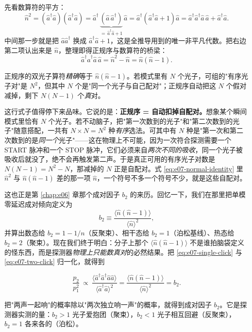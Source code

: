 先看数算符的平方：
\[
  \hat n^2=(\hat a^\dagger\hat a)(\hat a^\dagger\hat a)
  =\hat a^\dagger\,\underbrace{(\hat a\,\hat a^\dagger)}_{=\,\hat a^\dagger\hat a+1}\,\hat a
  =\hat a^\dagger(\hat a^\dagger\hat a+1)\hat a
  =\hat a^\dagger\hat a^\dagger\hat a\,\hat a+\hat a^\dagger\hat a .
\]
中间那一步就是把 \(\hat a\hat a^\dagger\) 换成 \(\hat a^\dagger\hat a+1\)，这是全推导用到的唯一非平凡代数。把右边第二项认出来是 \(\hat n\)，整理即得正规序与数算符的桥梁：
\begin{equation}
  \hat a^\dagger\hat a^\dagger\hat a\,\hat a
  =\hat n^2-\hat n
  =\hat n(\hat n-1).
  \label{eq:e07-normal-identity}
\end{equation}
\begin{formulaexplain}
正规序的双光子算符\emph{精确}等于 \(\hat n(\hat n-1)\)。若模式里有 \(N\) 个光子，可组的"有序光子对"是 \(N^2\)，但其中 \(N\) 个是"同一个光子与自己配对"；正规序自动把这 \(N\) 个假对减掉，剩下 \(N(N-1)\) 个\emph{真}对。
\end{formulaexplain}

这行式子值得停下来品味。它说的是：\textbf{正规序 = 自动扣掉自配对。}想象某个瞬间模式里恰有 \(N\) 个光子。若不动脑子，把"第一次数到的光子"和"第二次数到的光子"随意搭配，一共有 \(N\times N=N^2\) 种\emph{有序}选法。可其中有 \(N\) 种是"第一次和第二次数到的是\emph{同一个}光子"——这在物理上不可能，因为一次符合探测需要一个 START 脉冲和一个 STOP 脉冲，它们必须来自\emph{两次不同的吸收}，同一个光子被吸收后就没了，绝不会再触发第二声。于是真正可用的有序光子对数是 \(N(N-1)=N^2-N\)，那减掉的 \(N\) 正是自配对。式 \eqref{eq:e07-normal-identity} 里 \(\hat n^2\) 与 \(\hat n(\hat n-1)\) 差的那一项 \(\hat n\)，一个符号不多一个符号不少，就是这些自配对。

这也正是第 \ref{chap:e06} 章那个成对因子 \(b_2\) 的来历。回忆一下，我们在那里把单模零延迟成对倾向定义为
\[
  b_2\equiv\frac{\langle\hat n(\hat n-1)\rangle}{\langle\hat n\rangle^2},
\]
并算出数态给 \(b_2=1-1/n\)（反聚束）、相干态给 \(b_2=1\)（泊松基线）、热态给 \(b_2=2\)（聚束）。现在我们终于明白：分子上那个 \(\langle\hat n(\hat n-1)\rangle\) 不是谁拍脑袋定义的怪东西，而是探测器\emph{物理上只能数真对}的必然结果。把 \eqref{eq:e07-single-click} 与 \eqref{eq:e07-two-click} 归一化，就得到

\begin{equation}
  \frac{p_2}{p_1^2}\ \propto\
  \frac{\langle\hat a^\dagger\hat a^\dagger\hat a\hat a\rangle}{\langle\hat a^\dagger\hat a\rangle^2}
  =\frac{\langle\hat n(\hat n-1)\rangle}{\langle\hat n\rangle^2}
  =b_2 .
  \label{eq:e07-b2-from-clicks}
\end{equation}
\begin{formulaexplain}
把"两声一起响"的概率除以"两次独立响一声"的概率，就得到成对因子 \(b_2\)。它是探测器实测的量：\(b_2>1\) 光子爱抱团（聚束），\(b_2<1\) 光子相互回避（反聚束），\(b_2=1\) 各来各的（泊松）。
\end{formulaexplain}

